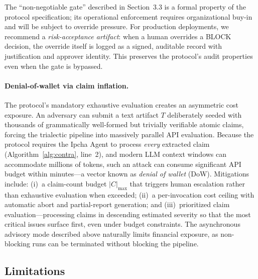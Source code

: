 \documentclass[11pt,a4paper]{article}
\begin{document}
The ``non-negotiable gate'' described in Section~3.3 is a formal property of the protocol specification; its operational enforcement requires organizational buy-in and will be subject to override pressure.
For production deployments, we recommend a \emph{risk-acceptance artifact}: when a human overrides a BLOCK decision, the override itself is logged as a signed, auditable record with justification and approver identity.
This preserves the protocol's audit properties even when the gate is bypassed.

\paragraph{Denial-of-wallet via claim inflation.}
The protocol's mandatory exhaustive evaluation creates an asymmetric cost exposure.
An adversary can submit a text artifact $T$ deliberately seeded with thousands of grammatically well-formed but trivially verifiable atomic claims, forcing the trialectic pipeline into massively parallel API evaluation.
Because the protocol requires the Ipcha Agent to process \emph{every} extracted claim (Algorithm~\ref{alg:contra}, line~2), and modern LLM context windows can accommodate millions of tokens, such an attack can consume significant API budget within minutes---a vector known as \emph{denial of wallet} (DoW).
Mitigations include:
(i)~a claim-count budget $|C|_{\max}$ that triggers human escalation rather than exhaustive evaluation when exceeded;
(ii)~a per-invocation cost ceiling with automatic abort and partial-report generation; and
(iii)~prioritized claim evaluation---processing claims in descending estimated severity so that the most critical issues surface first, even under budget constraints.
The asynchronous advisory mode described above naturally limits financial exposure, as non-blocking runs can be terminated without blocking the pipeline.

\subsection{Limitations}
\label{sec:limitations}
\end{document}
